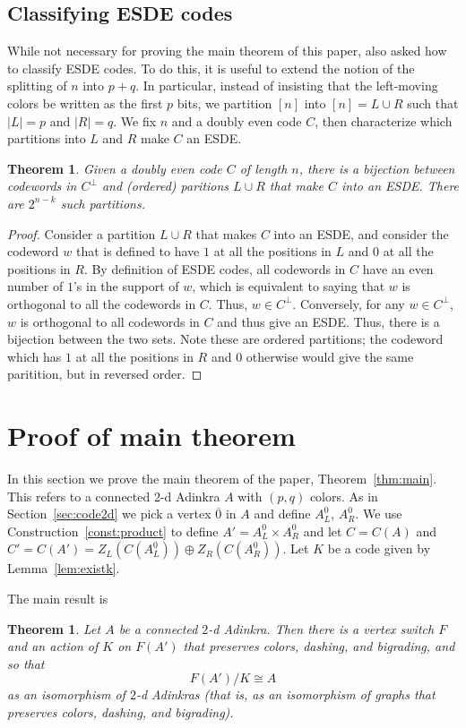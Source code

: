 \documentclass[12pt,twoside,singlespace]{article}
\numberwithin{equation}{section}
\newtheorem{thm}[equation]{Theorem}
\theoremstyle{definition}
\begin{document}
\subsection{Classifying ESDE codes}
While not necessary for proving the main theorem of this paper, \cite{hubsch:weaving} also asked how to classify ESDE codes.  To do this, it is useful to extend the notion of the splitting of $n$ into $p+q$.  In particular, instead of insisting that the left-moving colors be written as the first $p$ bits, we partition $[n]$ into $[n]=L\cup R$ such that $|L|=p$ and $|R|=q$.  We fix $n$ and a doubly even code $C$, then characterize which partitions into $L$ and $R$ make $C$ an ESDE.

\begin{thm}
\label{thm:esde}
Given a doubly even code $C$ of length $n$, there is a bijection between codewords in $C^\perp$ and (ordered) paritions $L \cup R$ that make $C$ into an ESDE. There are $2^{n-k}$ such partitions. 
\end{thm}
\begin{proof}
Consider a partition $L \cup R$ that makes $C$ into an ESDE, and consider the codeword $w$ that is defined to have $1$ at all the positions in $L$ and $0$ at all the positions in $R$.  By definition of ESDE codes, all codewords in $C$ have an even number of $1$'s in the support of $w$, which is equivalent to saying that $w$ is orthogonal to all the codewords in $C$. Thus, $w \in C^\perp$.  Conversely, for any $w \in C^\perp$, $w$ is orthogonal to all codewords in $C$ and thus give an ESDE. Thus, there is a bijection between the two sets.  Note these are ordered partitions; the codeword which has $1$ at all the positions in $R$ and $0$ otherwise would give the same paritition, but in reversed order.
\end{proof}

\section{Proof of main theorem}
\label{sec:quotient}
In this section we prove the main theorem of the paper, Theorem~\ref{thm:main}.  This refers to a connected $2$-d Adinkra $A$ with $(p,q)$ colors.  As in Section~\ref{sec:code2d} we pick a vertex $\overline{0}$ in $A$ and define $A_L^0$, $A_R^0$.  We use Construction~\ref{const:product} to define $A'=A_L^0\times A_R^0$ and let $C=C(A)$ and $C'=C(A')=Z_L(C(A_L^0))\oplus Z_R(C(A_R^0))$.  Let $K$ be a code given by Lemma~\ref{lem:existk}.

The main result is
\begin{thm}
\label{thm:quotient}
Let $A$ be a connected $2$-d Adinkra.  Then there is a vertex switch $F$ and an action of $K$ on $F(A')$ that preserves colors, dashing, and bigrading, and so that
\[F(A')/K\cong A\]
as an isomorphism of $2$-d Adinkras (that is, as an isomorphism of graphs that preserves colors, dashing, and bigrading).
\end{thm}
\end{document}
